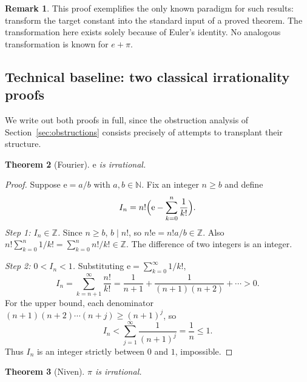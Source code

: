 \documentclass[11pt]{amsart}
\newtheorem{theorem}{Theorem}[section]
\theoremstyle{definition}
\newtheorem{remark}[theorem]{Remark}
\theoremstyle{remark}
\numberwithin{equation}{section}
\newcommand{\Z}{\mathbb{Z}}
\newcommand{\N}{\mathbb{N}}
\newcommand{\ee}{\mathrm{e}}
\begin{document}
\begin{remark}
This proof exemplifies the only known paradigm for such results: transform the target constant into the standard input of a proved theorem. The transformation here exists solely because of Euler's identity. No analogous transformation is known for $e+\pi$.
\end{remark}

\subsection{Technical baseline: two classical irrationality proofs}

We write out both proofs in full, since the obstruction analysis of Section~\ref{sec:obstructions} consists precisely of attempts to transplant their structure.

\begin{theorem}[Fourier]\label{thm:fourier}
$\ee$ is irrational.
\end{theorem}

\begin{proof}
Suppose $\ee=a/b$ with $a,b\in\N$. Fix an integer $n\ge b$ and define
\[
I_n=n!\Bigl(\ee-\sum_{k=0}^{n}\frac{1}{k!}\Bigr).
\]
\emph{Step 1: $I_n\in\Z$.} Since $n\ge b$, $b\mid n!$, so $n!\ee=n!a/b\in\Z$. Also $n!\sum_{k=0}^n 1/k!=\sum_{k=0}^n n!/k!\in\Z$. The difference of two integers is an integer.

\emph{Step 2: $0<I_n<1$.} Substituting $\ee=\sum_{k=0}^\infty 1/k!$,
\[
I_n=\sum_{k=n+1}^{\infty}\frac{n!}{k!}=\frac{1}{n+1}+\frac{1}{(n+1)(n+2)}+\cdots>0.
\]
For the upper bound, each denominator $(n+1)(n+2)\cdots(n+j)\ge(n+1)^j$, so
\[
I_n<\sum_{j=1}^{\infty}\frac{1}{(n+1)^j}=\frac{1}{n}\le 1.
\]
Thus $I_n$ is an integer strictly between $0$ and $1$, impossible.
\end{proof}

\begin{theorem}[Niven]\label{thm:niven}
$\pi$ is irrational.
\end{theorem}
\end{document}
